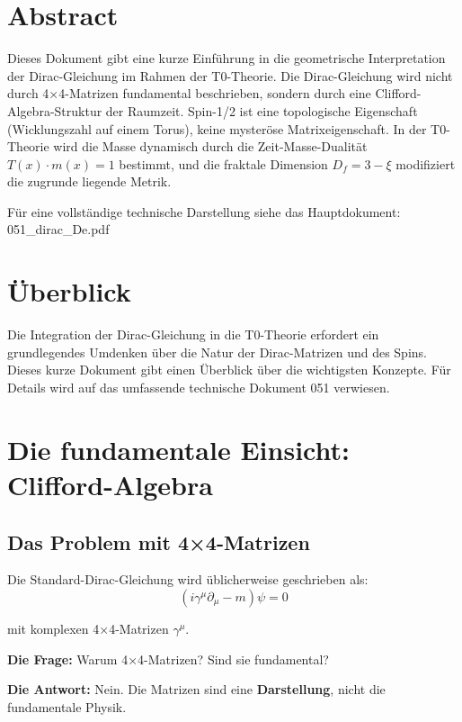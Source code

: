 \section*{Abstract}
		Dieses Dokument gibt eine kurze Einführung in die geometrische Interpretation 
		der Dirac-Gleichung im Rahmen der T0-Theorie. Die Dirac-Gleichung wird nicht 
		durch 4×4-Matrizen fundamental beschrieben, sondern durch eine Clifford-Algebra-Struktur 
		der Raumzeit. Spin-1/2 ist eine topologische Eigenschaft (Wicklungszahl auf einem 
		Torus), keine mysteröse Matrixeigenschaft. In der T0-Theorie wird die Masse 
		dynamisch durch die Zeit-Masse-Dualität $T(x) \cdot m(x) = 1$ bestimmt, und die 
		fraktale Dimension $D_f = 3 - \xi$ modifiziert die zugrunde liegende Metrik. 
		
		Für eine vollständige technische Darstellung siehe das Hauptdokument: 
		051\_dirac\_De.pdf

	
	
	\section{Überblick}
	
	Die Integration der Dirac-Gleichung in die T0-Theorie erfordert ein grundlegendes 
	Umdenken über die Natur der Dirac-Matrizen und des Spins. Dieses kurze Dokument 
	gibt einen Überblick über die wichtigsten Konzepte. Für Details wird auf das 
	umfassende technische Dokument 051 verwiesen.
	
	\section{Die fundamentale Einsicht: Clifford-Algebra}
	
	\subsection{Das Problem mit 4×4-Matrizen}
	
	Die Standard-Dirac-Gleichung wird üblicherweise geschrieben als:
	\begin{equation}
		(i\gamma^\mu \partial_\mu - m)\psi = 0
	\end{equation}
	
	mit komplexen 4×4-Matrizen $\gamma^\mu$.
	
	\textbf{Die Frage:} Warum 4×4-Matrizen? Sind sie fundamental?
	
	\textbf{Die Antwort:} Nein. Die Matrizen sind eine \textbf{Darstellung}, nicht die 
	fundamentale Physik.
	
